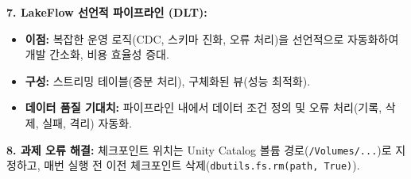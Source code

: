 \documentclass[11pt,a4paper]{article}
\theoremstyle{definition}
\begin{document}
\begin{enumerate}
\begin{tcolorbox}[summarybox]
\textbf{7. LakeFlow 선언적 파이프라인 (DLT):}
\begin{itemize}
    \item \textbf{이점:} 복잡한 운영 로직(CDC, 스키마 진화, 오류 처리)을 선언적으로 자동화하여 개발 간소화, 비용 효율성 증대.
    \item \textbf{구성:} 스트리밍 테이블(증분 처리), 구체화된 뷰(성능 최적화).
    \item \textbf{데이터 품질 기대치:} 파이프라인 내에서 데이터 조건 정의 및 오류 처리(기록, 삭제, 실패, 격리) 자동화.
\end{itemize}

\textbf{8. 과제 오류 해결:} 체크포인트 위치는 Unity Catalog 볼륨 경로(\texttt{/Volumes/...})로 지정하고, 매번 실행 전 이전 체크포인트 삭제(\texttt{dbutils.fs.rm(path, True)}).
\end{tcolorbox}


\end{enumerate}  %
\end{document}
